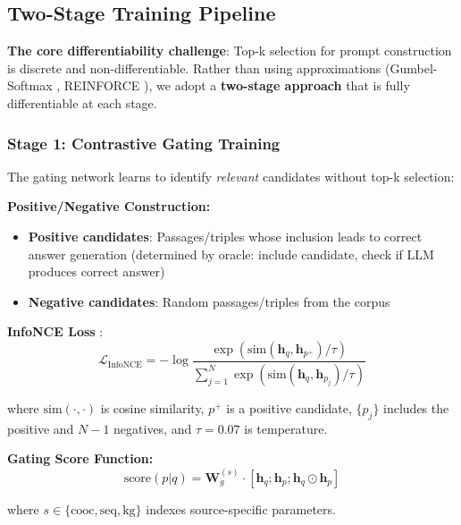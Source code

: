 \documentclass[10pt,twocolumn]{article}
\begin{document}
\subsection{Two-Stage Training Pipeline}
\label{sec:training}

\textbf{The core differentiability challenge}: Top-k selection for prompt construction is discrete and non-differentiable. Rather than using approximations (Gumbel-Softmax \cite{jang2017gumbel}, REINFORCE \cite{williams1992reinforce}), we adopt a \textbf{two-stage approach} that is fully differentiable at each stage.

\subsubsection{Stage 1: Contrastive Gating Training}
\label{sec:stage1}

The gating network learns to identify \textit{relevant} candidates without top-k selection:

\textbf{Positive/Negative Construction:}
\begin{itemize}
    \item \textbf{Positive candidates}: Passages/triples whose inclusion leads to correct answer generation (determined by oracle: include candidate, check if LLM produces correct answer)
    \item \textbf{Negative candidates}: Random passages/triples from the corpus
\end{itemize}

\textbf{InfoNCE Loss} \cite{oord2018infonce}:
\begin{equation}
\mathcal{L}_{\text{InfoNCE}} = -\log \frac{\exp(\text{sim}(\mathbf{h}_q, \mathbf{h}_{p^+}) / \tau)}{\sum_{j=1}^{N} \exp(\text{sim}(\mathbf{h}_q, \mathbf{h}_{p_j}) / \tau)}
\label{eq:infonce}
\end{equation}

where $\text{sim}(\cdot, \cdot)$ is cosine similarity, $p^+$ is a positive candidate, $\{p_j\}$ includes the positive and $N-1$ negatives, and $\tau=0.07$ is temperature.

\textbf{Gating Score Function:}
\begin{equation}
\text{score}(p|q) = \mathbf{W}_g^{(s)} \cdot [\mathbf{h}_q; \mathbf{h}_p; \mathbf{h}_q \odot \mathbf{h}_p]
\label{eq:gating_score}
\end{equation}

where $s \in \{\text{cooc}, \text{seq}, \text{kg}\}$ indexes source-specific parameters.
\end{document}
